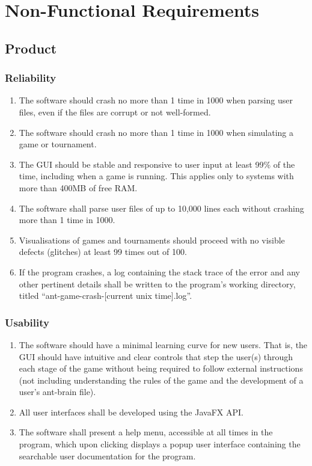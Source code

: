 \documentclass[11pt]{article}
\providecommand{\tightlist}{%
  \setlength{\itemsep}{0pt}\setlength{\parskip}{0pt}}
\begin{document}
\newpage
\section{Non-Functional Requirements}

\subsection{Product}\label{product}

\subsubsection{Reliability}\label{reliability}

\begin{enumerate}
\def\labelenumi{\arabic{enumi}.}
\tightlist
\item
  The software should crash no more than 1 time in 1000 when parsing
  user files, even if the files are corrupt or not well-formed.
\item
  The software should crash no more than 1 time in 1000 when simulating
  a game or tournament.
\item
  The GUI should be stable and responsive to user input at least 99\% of
  the time, including when a game is running. This applies only to
  systems with more than 400MB of free RAM.
\item
  The software shall parse user files of up to 10,000 lines each without
  crashing more than 1 time in 1000.
\item
  Visualisations of games and tournaments should proceed with no visible
  defects (glitches) at least 99 times out of 100.
\item
  If the program crashes, a log containing the stack trace of the error
  and any other pertinent details shall be written to the program's
  working directory, titled ``ant-game-crash-{[}current unix
  time{]}.log''.
\end{enumerate}

\subsubsection{Usability}\label{usability}

\begin{enumerate}
\def\labelenumi{\arabic{enumi}.}
\tightlist
\item
  The software should have a minimal learning curve for new users. That
  is, the GUI should have intuitive and clear controls that step the
  user(s) through each stage of the game without being required to
  follow external instructions (not including understanding the rules of
  the game and the development of a user's ant-brain file).
\item
  All user interfaces shall be developed using the JavaFX API.
\item
  The software shall present a help menu, accessible at all times in the
  program, which upon clicking displays a popup user interface
  containing the searchable user documentation for the program.
\end{enumerate}
\end{document}
